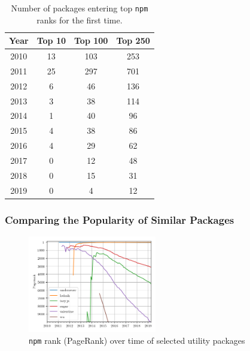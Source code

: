 \documentclass[10pt,conference]{IEEEtran}
\def\code#1{\texttt{#1}}
\begin{document}
\begin{table}
  \centering
  \begin{tabular}{c|c|c|c}
    Year & Top 10 & Top 100 & Top 250 \\
    \hline
    2010 & 13 & 103 & 253\\
    2011 & 25 & 297 & 701\\
    2012 & 6 & 46 & 136\\
    2013 & 3 & 38 & 114\\
    2014 & 1 & 40 & 96\\
    2015 & 4 & 38 & 86\\
    2016 & 4 & 29 & 62\\
    2017 & 0 & 12 & 48\\
    2018 & 0 & 15 & 31\\
    2019 & 0 & 4 & 12\\
  \end{tabular}
  \caption{Number of packages entering top \code{npm} ranks for the first time.}
  \label{numEnteringTop}
\end{table}


\subsubsection{Comparing the Popularity of Similar Packages}

\begin{figure}
  \includegraphics[width=0.5\textwidth]{figures/select_packages.png}
  \caption{\code{npm} rank (PageRank) over time of selected utility packages}
  \label{selectPackages}
\end{figure}
\end{document}
